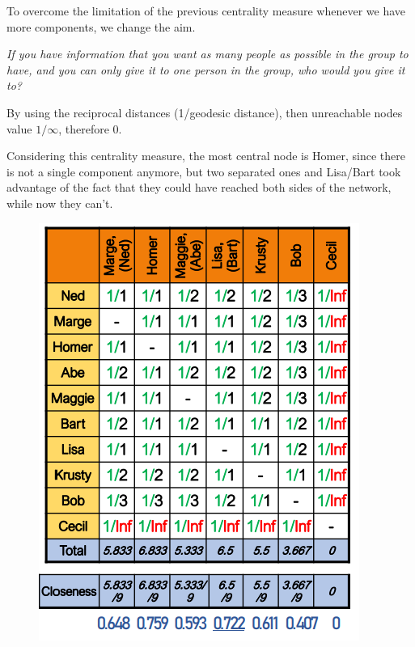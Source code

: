 \documentclass[
  notitlepage,
  onecolumn,
  openany]{book}
\begin{document}
To overcome the limitation of the previous centrality measure whenever we have more components, we change the aim.

\emph{If you have information that you want as many people as possible in the group to have, and you can only give it to one person in the group, who would you give it to?}

By using the reciprocal distances (1/geodesic distance), then unreachable nodes value \(1/\infty\), therefore 0.

Considering this centrality measure, the most central node is Homer, since there is not a single component anymore, but two separated ones and Lisa/Bart took advantage of the fact that they could have reached both sides of the network, while now they can't.

\begin{figure}[h!]

{\centering \includegraphics[width=0.5\linewidth]{images/04-Centrality/Untitled 3} 

}

\end{figure}
\end{document}
